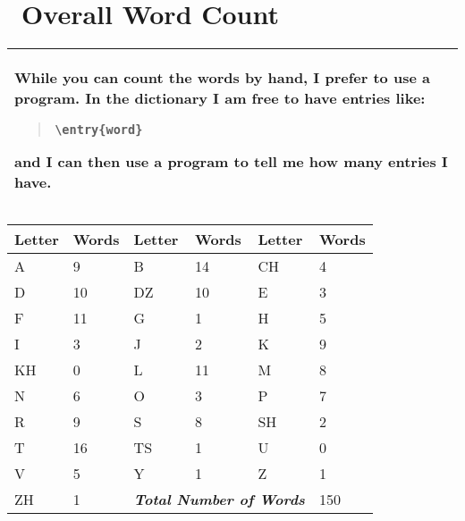 
\chapter{\LanguageName\ Overall Word Count}

\begin{center}
\begin{tabular}{|p{}|}\hline
While you can count the words by hand, I prefer to use a program.
In the dictionary I am free to have entries like:

\begin{quote}
\begin{verbatim}
\entry{word}
\end{verbatim}
\end{quote}

\noindent
and I can then use a program to tell me how many entries I have.\\
\hline
\end{tabular}
\end{center}

\begin{center}
\begin{tabular}{|l|l|l|l|l|l|}\hline
\textbf{Letter}&\textbf{Words}&\textbf{Letter}&\textbf{Words}&\textbf{Letter}&\textbf{Words}\\\hline
A & 9&B &14&CH&4\\\hline
D &10&DZ&10&E &3\\\hline
F &11&G & 1&H &5\\\hline
I & 3&J & 2&K &9\\\hline
KH& 0&L &11&M &8\\\hline
N & 6&O & 3&P &7\\\hline
R & 9&S & 8&SH&2\\\hline
T &16&TS& 1&U &0\\\hline
V & 5&Y & 1&Z &1\\\hline
ZH& 1&\multicolumn{3}{r|}{\textbf{\textit{Total Number of Words}}}&150\\\hline
\end{tabular}
\end{center}


